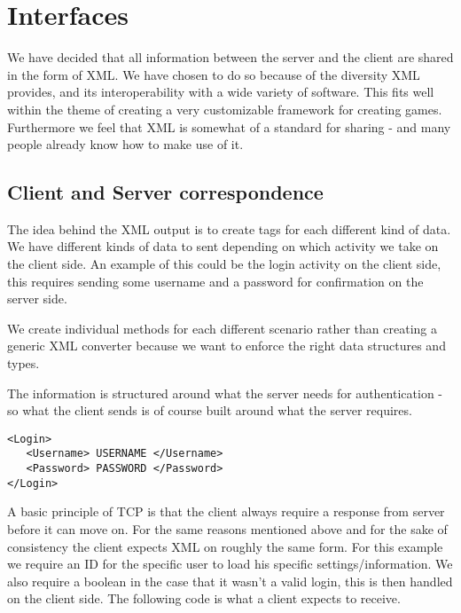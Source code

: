 \section{Interfaces}

We have decided that all information between the server and the client are shared in the form of XML. We have chosen to do so because of the diversity XML provides, and its interoperability with a wide variety of software. This fits well within the theme of creating a very customizable framework for creating games. Furthermore we feel that XML is somewhat of a standard for sharing - and many people already know how to make use of it.

\subsection{Client and Server correspondence}

The idea behind the XML output is to create tags for each different kind of data. We have different kinds of data to sent depending on which activity we take on the client side. An example of this could be the login activity on the client side, this requires sending some username and a password for confirmation on the server side.

We create individual methods for each different scenario rather than creating a generic XML converter because we want to enforce the right data structures and types. 

The information is structured around what the server needs for authentication - so what the client sends is of course built around what the server requires.

\begin{lstlisting}
<Login>
   <Username> USERNAME </Username>
   <Password> PASSWORD </Password>
</Login>
\end{lstlisting}

A basic principle of TCP is that the client always require a response from server before it can move on. For the same reasons mentioned above and for the sake of consistency the client expects XML on roughly the same form. For this example we require an ID for the specific user to load his specific settings/information. We also require a boolean in the case that it wasn't a valid login, this is then handled on the client side. The following code is what a client expects to receive.

